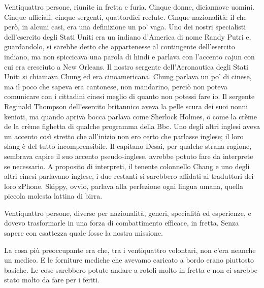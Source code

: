 Ventiquattro persone, riunite in fretta e furia. Cinque donne,
diciannove uomini. Cinque ufficiali, cinque sergenti, quattordici
reclute. Cinque nazionalità: il che però, in alcuni casi, era una
definizione un po' vaga. Uno dei nostri specialisti dell'esercito degli
Stati Uniti era un indiano d'America di nome Randy Putri e, guardandolo,
si sarebbe detto che appartenesse al contingente dell'esercito indiano,
ma non spiccicava una parola di hindi e parlava con l'accento cajun con
cui era cresciuto a New Orleans. Il nostro sergente dell'Aeronautica
degli Stati Uniti si chiamava Chung ed era cinoamericana. Chung parlava
un po' di cinese, ma il poco che sapeva era cantonese, non mandarino,
perciò non poteva comunicare con i cittadini cinesi meglio di quanto non
potessi fare io. Il sergente Reginald Thompson dell'esercito britannico
aveva la pelle scura dei suoi nonni kenioti, ma quando apriva bocca
parlava come Sherlock Holmes, o come la crème de la crème fighetta di
qualche programma della Bbc. Uno degli altri inglesi aveva un accento
così stretto che all'inizio non ero certo che parlasse inglese; il loro
slang è del tutto incomprensibile. Il capitano Desai, per qualche strana
ragione, sembrava capire il suo accento pseudo-inglese, avrebbe potuto
fare da interprete se necessario. A proposito di interpreti, il tenente
colonnello Chang e uno degli altri cinesi parlavano inglese, i due
restanti si sarebbero affidati ai traduttori dei loro zPhone. Skippy,
ovvio, parlava alla perfezione ogni lingua umana, quella piccola molesta
lattina di birra.

Ventiquattro persone, diverse per nazionalità, generi, specialità ed
esperienze, e dovevo trasformarle in una forza di combattimento
efficace, in fretta. Senza sapere con esattezza quale fosse la nostra
missione.

La cosa più preoccupante era che, tra i ventiquattro volontari, non
c'era neanche un medico. E le forniture mediche che avevamo caricato a
bordo erano piuttosto basiche. Le cose sarebbero potute andare a rotoli
molto in fretta e non ci sarebbe stato molto da fare per i feriti.

\hfill\break

